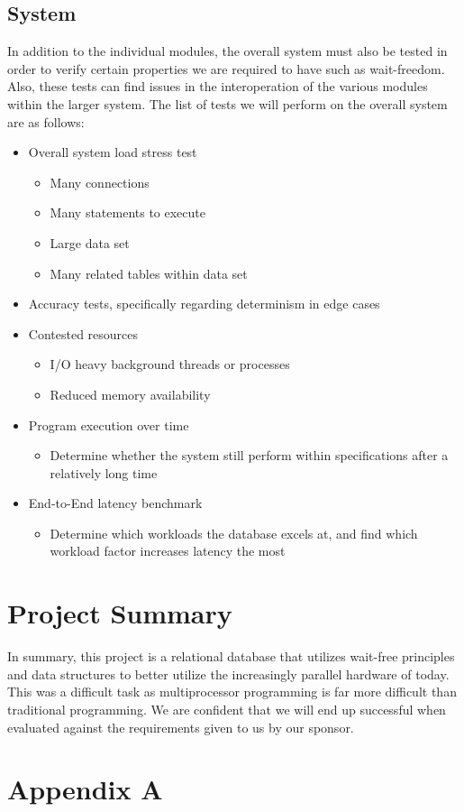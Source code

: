 \documentclass[letterpaper, 12pt]{article}
\begin{document}
\subsection{System}
In addition to the individual modules, the overall system must also be tested in order to verify certain
properties we are required to have such as wait-freedom. Also, these tests can find issues in the interoperation
of the various modules within the larger system. The list of tests we will perform on the overall system are
as follows:
\begin{itemize}
 \item Overall system load stress test
 \begin{itemize}
  \item Many connections
  \item Many statements to execute
  \item Large data set
  \item Many related tables within data set
 \end{itemize}
 \item Accuracy tests, specifically regarding determinism in edge cases
 \item Contested resources
 \begin{itemize}
  \item I/O heavy background threads or processes
  \item Reduced memory availability
 \end{itemize}
 \item Program execution over time
 \begin{itemize}
  \item Determine whether the system still perform within specifications after a relatively long time
 \end{itemize}
 \item End-to-End latency benchmark
 \begin{itemize}
  \item Determine which workloads the database excels at, and find which workload factor increases latency
	the most
 \end{itemize}
\end{itemize}

\newpage

\section{Project Summary}
In summary, this project is a relational database that utilizes wait-free principles and
data structures to better utilize the increasingly parallel hardware of today. This was a 
difficult task as multiprocessor programming is far more difficult than traditional
programming. We are confident that we will end up successful when evaluated against the 
requirements given to us by our sponsor.
\newpage



\newpage

\appendix
\section{Appendix A}
\end{document}
